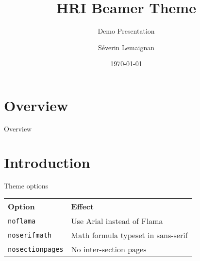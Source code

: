 \documentclass[compress]{beamer}
\title{HRI Beamer Theme}
\subtitle{Demo Presentation}
\date{\today}
\author{Séverin Lemaignan}
\institute{Computer-Human Interaction\\for Learning and Instruction {\Medium
EPFL}}
\begin{document}

\maketitle


\section*{Overview}
\begin{frame}{Overview}
	\tableofcontents[hideallsubsections]
\end{frame}

\section{Introduction}

\begin{frame}{Theme options}
\begin{table}[]
	\begin{tabularx}{\linewidth}{l>{\raggedright}X}
		\toprule
		\textbf{Option}			& \textbf{Effect} \tabularnewline
		\midrule
		\texttt{noflama}		& Use Arial instead of Flama \tabularnewline
		\texttt{noserifmath}		& Math formula typeset in sans-serif \tabularnewline
		\texttt{nosectionpages} & No inter-section pages \tabularnewline
		\bottomrule
	\end{tabularx}
	\label{tab:options}
\end{table}
\end{frame}
\end{document}
